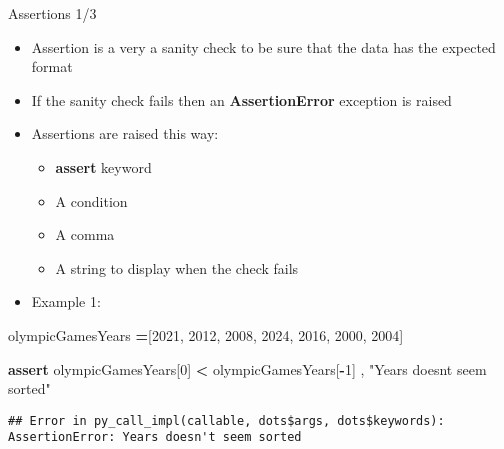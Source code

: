 \documentclass[
  8pt,
  ignorenonframetext,
]{beamer}
\newenvironment{Shaded}{\begin{snugshade}}{\end{snugshade}}
\newcommand{\ControlFlowTok}[1]{\textcolor[rgb]{0.13,0.29,0.53}{\textbf{#1}}}
\newcommand{\DecValTok}[1]{\textcolor[rgb]{0.00,0.00,0.81}{#1}}
\newcommand{\NormalTok}[1]{#1}
\newcommand{\OperatorTok}[1]{\textcolor[rgb]{0.81,0.36,0.00}{\textbf{#1}}}
\newcommand{\StringTok}[1]{\textcolor[rgb]{0.31,0.60,0.02}{#1}}
\providecommand{\tightlist}{%
  \setlength{\itemsep}{0pt}\setlength{\parskip}{0pt}}
\begin{document}
\begin{frame}[fragile]{Assertions 1/3}
\protect\hypertarget{assertions-13}{}
\begin{itemize}
\item
  Assertion is a very a sanity check to be sure that the data has the
  expected format
\item
  If the sanity check fails then an \textbf{AssertionError} exception is
  raised
\item
  Assertions are raised this way:

  \begin{itemize}
  \tightlist
  \item
    \textbf{assert} keyword
  \item
    A condition
  \item
    A comma
  \item
    A string to display when the check fails
  \end{itemize}
\item
  Example 1:
\end{itemize}

\begin{Shaded}
\begin{Highlighting}[]
\NormalTok{olympicGamesYears }\OperatorTok{=}\NormalTok{[}\DecValTok{2021}\NormalTok{, }\DecValTok{2012}\NormalTok{, }\DecValTok{2008}\NormalTok{, }\DecValTok{2024}\NormalTok{, }\DecValTok{2016}\NormalTok{, }\DecValTok{2000}\NormalTok{, }\DecValTok{2004}\NormalTok{]}

\ControlFlowTok{assert}\NormalTok{ olympicGamesYears[}\DecValTok{0}\NormalTok{] }\OperatorTok{\textless{}}\NormalTok{ olympicGamesYears[}\OperatorTok{{-}}\DecValTok{1}\NormalTok{] , }\StringTok{"Years doesn\textquotesingle{}t seem sorted"}
\end{Highlighting}
\end{Shaded}

\begin{verbatim}
## Error in py_call_impl(callable, dots$args, dots$keywords): AssertionError: Years doesn't seem sorted
\end{verbatim}
\end{frame}
\end{document}
